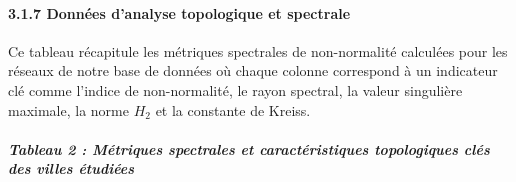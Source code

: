\documentclass[10pt, a4paper]{article}
\begin{document}
\paragraph{3.1.7 Données d'analyse topologique et
spectrale}\label{donnuxe9es-danalyse-topologique-et-spectrale}

Ce tableau récapitule les métriques spectrales de non-normalité
calculées pour les réseaux de notre base de données où chaque colonne
correspond à un indicateur clé comme l'indice de non-normalité, le rayon
spectral, la valeur singulière maximale, la norme \(H_2\) et la
constante de Kreiss.

\subparagraph{Tableau 2 : Métriques spectrales et caractéristiques
topologiques clés des villes
étudiées}\label{tableau-2-muxe9triques-spectrales-et-caractuxe9ristiques-topologiques-cluxe9s-des-villes-uxe9tudiuxe9es}
\end{document}
